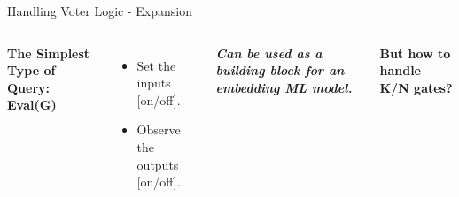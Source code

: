 \begin{frame}[t]{Handling Voter Logic - Expansion} 
  \begin{columns}
    {
      \textbf{The Simplest Type of Query: Eval(G)}\par
      \begin{itemize}
          \item {Set the inputs [on/off].}
          \item {Observe the outputs [on/off].}
      \end{itemize}\par
      \vspace{2pt}
      \tiny{\textbf{\emph{{Can be used as a building block for an embedding ML model.}}}}\par
            \vspace{10pt}
      \normalsize\textbf{But how to handle K/N gates?}

    }
      \par %
  \end{columns}
\end{frame}
